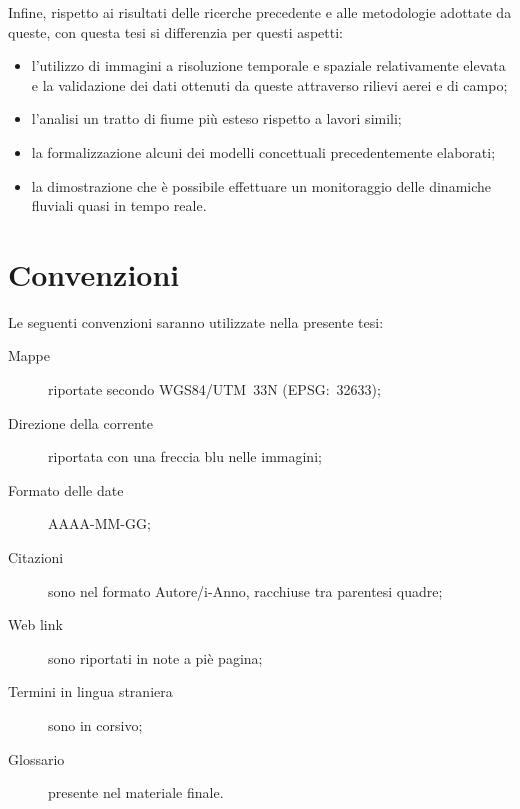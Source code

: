 %
Infine, rispetto ai risultati delle ricerche precedente e alle metodologie adottate da queste, con questa tesi si differenzia per questi aspetti:
%
\begin{itemize}
	\item l'utilizzo di immagini a risoluzione temporale e spaziale relativamente elevata e la validazione dei dati ottenuti da queste attraverso rilievi aerei e di campo;
	\item l'analisi un tratto di fiume più esteso rispetto a lavori simili;
	\item la formalizzazione alcuni dei modelli concettuali precedentemente elaborati;	
	\item la dimostrazione che è possibile effettuare un monitoraggio delle dinamiche fluviali quasi in tempo reale. 
\end{itemize}

\section{Convenzioni}
Le seguenti convenzioni saranno utilizzate nella presente tesi:
\begin{description}
	\item[Mappe] riportate secondo WGS84/UTM~33N (EPSG:~32633);
	\item[Direzione della corrente] riportata con una freccia blu nelle immagini;
	\item[Formato delle date] AAAA-MM-GG;
	\item[Citazioni] sono nel formato Autore/i-Anno, racchiuse tra parentesi quadre;
	\item[Web link] sono riportati in note a piè pagina;
	\item[Termini in lingua straniera] sono in corsivo;
	\item[Glossario] presente nel materiale finale.
\end{description}

